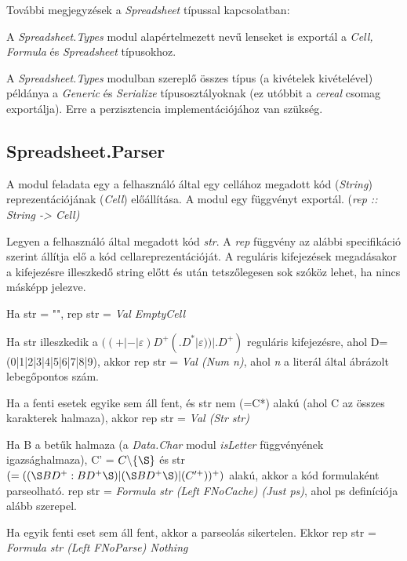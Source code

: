 További megjegyzések a \textit{Spreadsheet} típussal kapcsolatban:
\begin{compactenum}
	\item A \textit{Spreadsheet.Types} modul alapértelmezett nevű lenseket is exportál a \textit{Cell, Formula} és \textit{Spreadsheet} típusokhoz.
	\item A \textit{Spreadsheet.Types} modulban szereplő összes típus (a kivételek kivételével) példánya a \textit{Generic} és \textit{Serialize} típusosztályoknak (ez utóbbit a \textit{cereal} csomag exportálja). Erre a perzisztencia implementációjához van szükség.
\end{compactenum}

\subsection{Spreadsheet.Parser}

A modul feladata egy a felhasználó által egy cellához megadott kód (\textit{String}) reprezentációjának (\textit{Cell}) előállítása. A modul egy függvényt exportál. (\textit{rep :: String -> Cell)}

Legyen a felhasználó által megadott kód \textit{str}. A \textit{rep} függvény az alábbi specifikáció szerint állítja elő a kód cellareprezentációját. A reguláris kifejezések megadásakor a kifejezésre illeszkedő string előtt és után tetszőlegesen sok szóköz lehet, ha nincs másképp jelezve.

\begin{compactenum}
	\item Ha str = "", rep str = \textit{Val EmptyCell}
	\item Ha str illeszkedik a $((+|-|\varepsilon)D^+(.D^*|\varepsilon))|.D^+)$ reguláris kifejezésre, ahol D=(0|1|2|3|4|5|6|7|8|9), akkor rep str = \textit{Val (Num n)}, ahol \textit{n} a literál által ábrázolt lebegőpontos szám. 
	\item Ha a fenti esetek egyike sem áll fent, és str nem (=C*) alakú (ahol C az összes karakterek halmaza), akkor rep str = \textit{Val (Str str)}
	\item Ha B a betűk halmaza (a \textit{Data.Char} modul \textit{isLetter} függvényének igazsághalmaza), C' = $C \backslash \{\S\}$ és str $(=((\S  BD^+:BD^+\S )|(\S BD^+\S )|(C'^+))^+)$ alakú, akkor a kód formulaként parseolható. rep str = \textit{Formula str (Left FNoCache) (Just ps)}, ahol ps definíciója alább szerepel.
	\item Ha egyik fenti eset sem áll fent, akkor a parseolás sikertelen. Ekkor rep str = \textit{Formula str (Left FNoParse) Nothing}
\end{compactenum}

